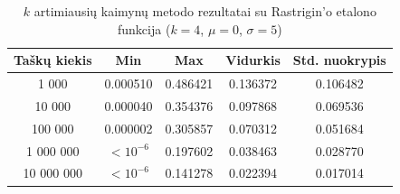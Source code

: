 \begin{table}[H]
    \centering
    \begin{tabular}{|c|c|c|c|c|}
        \hline
        \textbf{Taškų kiekis} & \textbf{Min} & \textbf{Max} & \textbf{Vidurkis} & \textbf{Std. nuokrypis} \\ \hline
        1 000        & 0.000510 & 0.486421 & 0.136372 & 0.106482 \\ \hline
        10 000       & 0.000040 & 0.354376 & 0.097868 & 0.069536 \\ \hline
        100 000      & 0.000002 & 0.305857 & 0.070312 & 0.051684 \\ \hline
        1 000 000    & $<10^{-6}$ & 0.197602 & 0.038463 & 0.028770 \\ \hline
        10 000 000   & $<10^{-6}$ & 0.141278 & 0.022394 & 0.017014 \\ \hline
    \end{tabular}
    \caption{$k$ artimiausių kaimynų metodo rezultatai su Rastrigin'o etalono funkcija ($k = 4$, $\mu = 0$, $\sigma = 5$)}
\end{table}